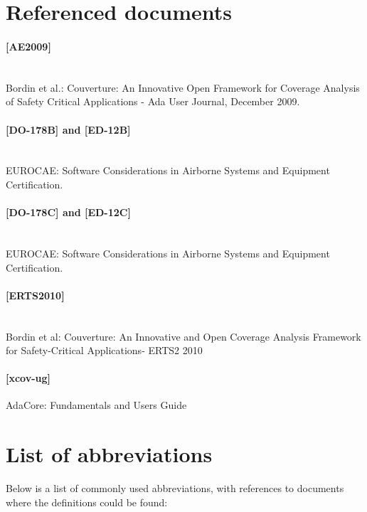 \newcommand{\ug}{[xcov-ug]}
\newcommand{\erts}{[ERTS2010]}
\newcommand{\adae}{[AE2009]}
\newcommand{\refdob}{[DO-178B]}
\newcommand{\refdoc}{[DO-178C]}

\section{Referenced documents}
\paragraph*{\adae{}} \ \\
Bordin et al.: Couverture: An Innovative Open Framework for Coverage Analysis
of Safety Critical Applications - Ada User Journal, December 2009.
\paragraph*{\refdob{} and [ED-12B]} \ \\
EUROCAE: Software Considerations in Airborne Systems and Equipment
Certification.
\paragraph*{\refdoc{} and [ED-12C]} \ \\
EUROCAE: Software Considerations in Airborne Systems and Equipment
Certification.
\paragraph*{\erts{}} \ \\
Bordin et al: Couverture: An Innovative and Open Coverage Analysis Framework
for Safety-Critical Applications- ERTS2 2010
\paragraph*{\ug{}}
AdaCore: \xcov{} Fundamentals and Users Guide

\section{List of abbreviations}

Below is a list of commonly used abbreviations, with references to documents
where the definitions could be found:

